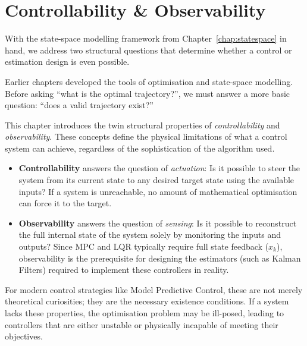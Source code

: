 
\chapter{Controllability \& Observability}
\label{chap:controllability}


With the state-space modelling framework from Chapter~\ref{chap:statespace} in hand, we address two structural questions that determine whether a control or estimation design is even possible.

Earlier chapters developed the tools of optimisation and state-space modelling. Before asking ``what is the optimal trajectory?'', we must answer a more basic question: ``does a valid trajectory exist?''

This chapter introduces the twin structural properties of \emph{controllability} and \emph{observability}. These concepts define the physical limitations of what a control system can achieve, regardless of the sophistication of the algorithm used.

\begin{itemize}
	\item \textbf{Controllability} answers the question of \textit{actuation}: Is it possible to steer the system from its current state to any desired target state using the available inputs? If a system is unreachable, no amount of mathematical optimisation can force it to the target.
	
	\item \textbf{Observability} answers the question of \textit{sensing}: Is it possible to reconstruct the full internal state of the system solely by monitoring the inputs and outputs? Since MPC and LQR typically require full state feedback ($x_k$), observability is the prerequisite for designing the estimators (such as Kalman Filters) required to implement these controllers in reality.
\end{itemize}

For modern control strategies like Model Predictive Control, these are not merely theoretical curiosities; they are the necessary existence conditions. If a system lacks these properties, the optimisation problem may be ill-posed, leading to controllers that are either unstable or physically incapable of meeting their objectives.

